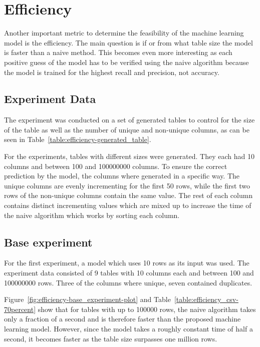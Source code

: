 \section{Efficiency}\label{sec:efficiency}
Another important metric to determine the feasibility of the machine learning model is the efficiency. The main question is if or from what table size the model is faster than a naive method. This becomes even more interesting as each positive guess of the model has to be verified using the naive algorithm because the model is trained for the highest recall and precision, not accuracy. %


\subsection{Experiment Data}\label{subsec:efficiency-experiment_data}
The experiment was conducted on a set of generated tables to control for the size of the table as well as the number of unique and non-unique columns, as can be seen in Table~\ref{table:efficiency-generated_table}.

For the experiments, tables with different sizes were generated. They each had \num{10} columns and between \num{100} and \num{100000000} columns. To ensure the correct prediction by the model, the columns where generated in a specific way. The unique columns are evenly incrementing for the first \num{50} rows, while the first two rows of the non-unique columns contain the same value. The rest of each column contains distinct incrementing values which are mixed up to increase the time of the naive algorithm which works by sorting each column. %




\subsection{Base experiment}\label{subsec:efficiency-base_experiment}
For the first experiment, a model which uses 10 rows as its input was used. The experiment data consisted of \num{9} tables with \num{10} columns each and between \num{100} and \num{100000000} rows. Three of the columns where unique, seven contained duplicates.

Figure~\ref{fig:efficiency-base_experiment-plot} and Table~\ref{table:efficiency_csv-70percent} show that for tables with up to \num{100000} rows, the naive algorithm takes only a fraction of a second and is therefore faster than the proposed machine learning model. However, since the model takes a roughly constant time of half a second, it becomes faster as the table size surpasses one million rows.

